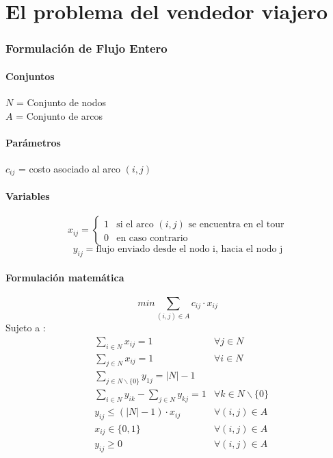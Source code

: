 \documentclass{article}
\numberwithin{equation}{section}
\begin{document}
\newpage
\part{El problema del vendedor viajero}
\section{Formulación de Flujo Entero}
\subsection{Conjuntos}
$N$ = Conjunto de nodos\\
$A$ = Conjunto de arcos
\subsection{Parámetros}
$c_{ij}$ = costo asociado al arco $(i,j)$
\subsection{Variables}
\begin{flushleft}
\[x_{ij}={\begin{cases}1&{\mbox{si el arco $(i,j)$ se encuentra en el tour}}\\0&{\mbox{en caso contrario}}\end{cases}}
\]
\[y_{ij} = \mbox{flujo enviado desde el nodo i, hacia el nodo j}\]
\end{flushleft}
\subsection{Formulación matemática}
\begin{equation}
min \sum_{(i,j) \in A} c_{ij} \cdot x_{ij}
\end{equation}
Sujeto a : \begin{align}
& \sum_{i \in N} x_{ij} = 1 &\forall j \in N \\
& \sum_{j \in N} x_{ij} = 1 &\forall i \in N \\
& \sum_{j \in N \backslash \{0\}} y_{1j} = |N| - 1 \\
& \sum_{i \in N} y_{ik} - \sum_{j \in N} y_{kj} = 1&\forall k \in N \backslash \{0\} \\
& y_{ij} \leq (|N| - 1) \cdot  x_{ij} & \forall (i,j) \in A\\
& x_{ij} \in \{0,1\} &\forall (i,j) \in A\\
& y_{ij} \geq 0 &\forall (i,j) \in A
\end{align}
\end{document}
